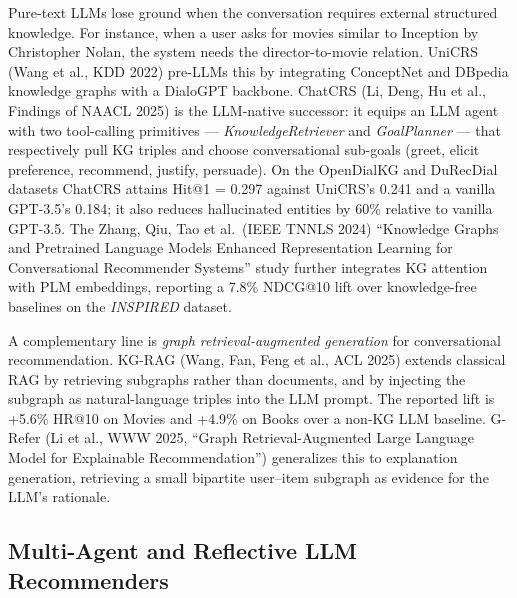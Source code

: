 Pure-text LLMs lose ground when the conversation requires external structured knowledge. For instance, when a user asks for movies similar to Inception by Christopher Nolan, the system needs the director-to-movie relation. UniCRS (Wang et al., KDD 2022) pre-LLMs this by integrating ConceptNet and DBpedia knowledge graphs with a DialoGPT backbone. ChatCRS (Li, Deng, Hu et al., Findings of NAACL 2025) is the LLM-native successor: it equips an LLM agent with two tool-calling primitives --- \emph{KnowledgeRetriever} and \emph{GoalPlanner} --- that respectively pull KG triples and choose conversational sub-goals (greet, elicit preference, recommend, justify, persuade). On the OpenDialKG and DuRecDial datasets ChatCRS attains Hit@1 = 0.297 against UniCRS's 0.241 and a vanilla GPT-3.5's 0.184; it also reduces hallucinated entities by 60\% relative to vanilla GPT-3.5. The Zhang, Qiu, Tao et al.~(IEEE TNNLS 2024) ``Knowledge Graphs and Pretrained Language Models Enhanced Representation Learning for Conversational Recommender Systems'' study further integrates KG attention with PLM embeddings, reporting a 7.8\% NDCG@10 lift over knowledge-free baselines on the \emph{INSPIRED} dataset.

A complementary line is \emph{graph retrieval-augmented generation} for conversational recommendation. KG-RAG (Wang, Fan, Feng et al., ACL 2025) extends classical RAG by retrieving subgraphs rather than documents, and by injecting the subgraph as natural-language triples into the LLM prompt. The reported lift is +5.6\% HR@10 on Movies and +4.9\% on Books over a non-KG LLM baseline. G-Refer (Li et al., WWW 2025, ``Graph Retrieval-Augmented Large Language Model for Explainable Recommendation'') generalizes this to explanation generation, retrieving a small bipartite user--item subgraph as evidence for the LLM's rationale.

\subsection{Multi-Agent and Reflective LLM Recommenders}\label{multi-agent-and-reflective-llm-recommenders}

